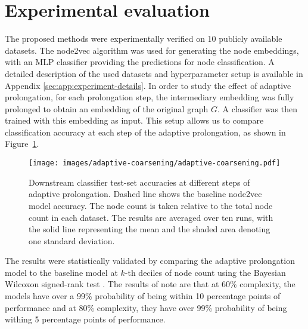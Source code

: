 \section{Experimental evaluation}\label{sec:experimental-evaluation}

The proposed methods were experimentally verified on 10 publicly available datasets. The node2vec algorithm was used for generating the node embeddings, with an MLP classifier providing the predictions for node classification. A detailed description of the used datasets and hyperparameter setup is available in Appendix \ref{sec:app:experiment-details}. In order to study the effect of adaptive prolongation, for each prolongation step, the intermediary embedding was fully prolonged to obtain an embedding of the original graph \( G \). A classifier was then trained with this embedding as input. This setup allows us to compare classification accuracy at each step of the adaptive prolongation, as shown in Figure~\ref{fig:adaptive-coarsening}.

\begin{figure}
  \centering
  \texttt{[image: images/adaptive-coarsening/adaptive-coarsening.pdf]}
  \caption{Downstream classifier test-set accuracies at different steps of adaptive prolongation. Dashed line shows the baseline node2vec model accuracy. The node count is taken relative to the total node count in each dataset. The results are averaged over ten runs, with the solid line representing the mean and the shaded area denoting one standard deviation.}
  \label{fig:adaptive-coarsening}
\end{figure}

The results were statistically validated by comparing the adaptive prolongation model to the baseline model at \( k \)-th deciles of node count using the Bayesian Wilcoxon signed-rank test \cite{benavoli_bayesian_2014}. The results of note are that at 60\% complexity, the models have over a 99\% probability of being within 10 percentage points of performance and at 80\% complexity, they have over 99\% probability of being withing 5 percentage points of performance.
